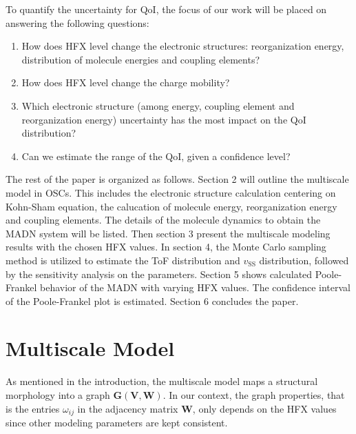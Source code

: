 \documentclass[%
 reprint,
superscriptaddress,
 amsmath,amssymb,
 aps,
prb,
floatfix
]{revtex4-2}
\begin{document}
To quantify the uncertainty for QoI, the focus of our work will be placed on answering the following questions: 
\begin{enumerate}
    \item How does HFX level change the electronic structures: reorganization energy, distribution of molecule energies and coupling elements? 
    \item How does HFX level change the charge mobility?
    \item Which electronic structure (among energy, coupling element and reorganization energy) uncertainty has the most impact on the QoI distribution?
    \item Can we estimate the range of the QoI, given a confidence level?
\end{enumerate}

The rest of the paper is organized as follows. Section 2 will outline the multiscale model in OSCs. This includes the electronic structure calculation centering on Kohn-Sham equation, the calucation of molecule energy, reorganization energy and coupling elements. The details of the molecule dynamics to obtain the MADN system will be listed.
Then section 3 present the multiscale modeling results with the chosen HFX values. In section 4, the Monte Carlo sampling method is utilized to estimate the ToF distribution and $v_\text{SS}$ distribution, followed by the sensitivity analysis on the parameters. 
Section 5 shows calculated Poole-Frankel behavior of the MADN with varying HFX values. The confidence interval of the Poole-Frankel plot is estimated. Section 6 concludes the paper. 
\section{Multiscale Model}
As mentioned in the introduction, the multiscale model maps a structural morphology into a graph $\mathbf{G}(\mathbf{V}, \mathbf{W})$. In our context, the graph properties, that is the entries $\omega_{ij}$ in the adjacency matrix $\mathbf{W}$, only depends on the HFX values since other modeling parameters are kept consistent. 
\end{document}
